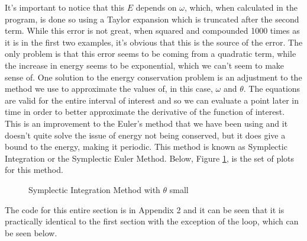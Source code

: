 \documentclass[12pt]{article}
\begin{document}
    \noindent
    It's important to notice that this $E$ depends on $\omega$, which, when calculated 
    in the program, is done so using a Taylor expansion which is truncated after the 
    second term. While this error is not great, when squared and compounded 1000 times 
    as it is in the first two examples, it's obvious that this is the source of the error. 
    The only problem is that this error seems to be coming from a quadratic term, while the 
    increase in energy seems to be exponential, which we can't seem to make sense of. 
    \newline
    \newline
    One solution to the energy conservation problem is an adjustment to the method we use 
    to approximate the values of, in this case, $\omega$ and $\theta$. The equations are 
    valid for the entire interval of interest and so we can evaluate a point later in time 
    in order to better approximate the derivative of the function of interest. This is an 
    improvement to the Euler's method that we have been using and it doesn't quite solve the 
    issue of energy not being conserved, but it does give a bound to the energy, making it 
    periodic. This method is known as Symplectic Integration or the Symplectic Euler Method.
    Below, Figure \ref{fig:symplectic}, is the set of plots for this method.

    \begin{figure}[H]
        \begin{center}
           \scalebox{.7}{}
           \caption{Symplectic Integration Method with $\theta$ small}
           \label{fig:symplectic}
        \end{center}
    \end{figure}
    
    \noindent
    The code for this entire section is in Appendix 2 and it can be seen that it is practically 
    identical to the first section with the exception of the loop, which can be seen below.
    \newline
    
    
\end{document}
